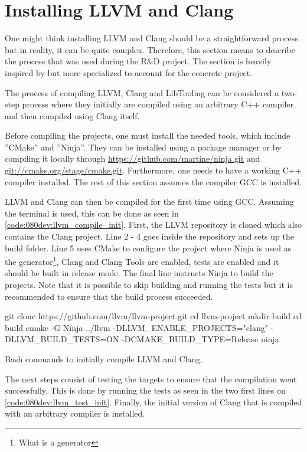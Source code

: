 \section{Installing LLVM and Clang}
One might think installing LLVM and Clang should be a straightforward process but in reality, it can be quite complex. Therefore, this section means to describe the process that was used during the R\&D project. The section is heavily inspired by \cite{TutorialBuildingTools} but more specialized to account for the concrete project.

The process of compiling LLVM, Clang and LibTooling can be considered a two-step process where they initially are compiled using an arbitrary C++ compiler and then compiled using Clang itself.

Before compiling the projects, one must install the needed tools, which include ''CMake'' and ''Ninja''. They can be installed using a package manager or by compiling it locally through \url{https://github.com/martine/ninja.git} and \url{git://cmake.org/stage/cmake.git}. Furthermore, one needs to have a working C++ compiler installed. The rest of this section assumes the compiler GCC is installed.


LLVM and Clang can then be compiled for the first time using GCC. Assuming the terminal is used, this can be done as seen in \cref{code:080dev:llvm_compile_init}.
First, the LLVM repository is cloned which also contains the Clang project.
Line 2 - 4 goes inside the repository and sets up the build folder.
Line 5 uses CMake to configure the project where Ninja is used as the generator\footnote{What is a generator}, Clang and Clang Tools are enabled, tests are enabled and it should be built in release mode. The final line instructs Ninja to build the projects. Note that it is possible to skip building and running the tests but it is recommended to ensure that the build process succeeded.

\begin{listing}[H]
    \begin{bashcode}
git clone https://github.com/llvm/llvm-project.git
cd llvm-project
mkdir build
cd build
cmake -G Ninja ../llvm -DLLVM_ENABLE_PROJECTS="clang" -DLLVM_BUILD_TESTS=ON -DCMAKE_BUILD_TYPE=Release
ninja
    \end{bashcode}
    \caption{Bash commands to initially compile LLVM and Clang.}
    \label{code:080dev:llvm_compile_init}
\end{listing}

The next steps consist of testing the targets to ensure that the compilation went successfully. This is done by running the tests as seen in the two first lines on \cref{code:080dev:llvm_test_init}. Finally, the initial version of Clang that is compiled with an arbitrary compiler is installed.

